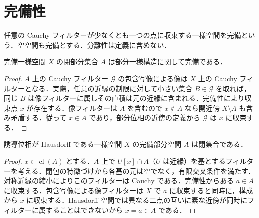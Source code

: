 \section{完備性}
\begin{defn}[完備一様空間]
任意の Cauchy フィルターが少なくとも一つの点に収束する一様空間を完備という．空空間も完備とする．分離性は定義に含めない．
\end{defn}
\begin{prop}[閉部分空間の完備性]
完備一様空間 $X$ の閉部分集合 $A$ は部分一様構造に関して完備である．
\end{prop}
\begin{proof}
$A$ 上の Cauchy フィルター $\mathcal G$ の包含写像による像は $X$ 上の Cauchy フィルターとなる．実際，任意の近縁の制限に対して小さい集合 $B\in\mathcal G$ を取れば，同じ $B$ は像フィルターに属しその直積は元の近縁に含まれる．完備性により収束点 $x$ が存在する．像フィルターは $A$ を含むので $x\notin A$ なら開近傍 $X\setminus A$ も含み矛盾する．従って $x\in A$ であり，部分位相の近傍の定義から $\mathcal G$ は $x$ に収束する．
\end{proof}
\begin{prop}[分離一様空間の完備部分空間]
誘導位相が Hausdorff である一様空間 $X$ の完備部分空間 $A$ は閉集合である．
\end{prop}
\begin{proof}
$x\in\operatorname{cl}(A)$ とする．$A$ 上で $U[x]\cap A$（$U$ は近縁）を基とするフィルターを考える．閉包の特徴づけから各基の元は空でなく，有限交叉条件を満たす．対称近縁の縮小によりこのフィルターは Cauchy である．完備性からある $a\in A$ に収束する．包含写像による像フィルターは $X$ で $a$ に収束すると同時に，構成から $x$ に収束する．Hausdorff 空間では異なる二点の互いに素な近傍が同時にフィルターに属することはできないから $x=a\in A$ である．
\end{proof}
